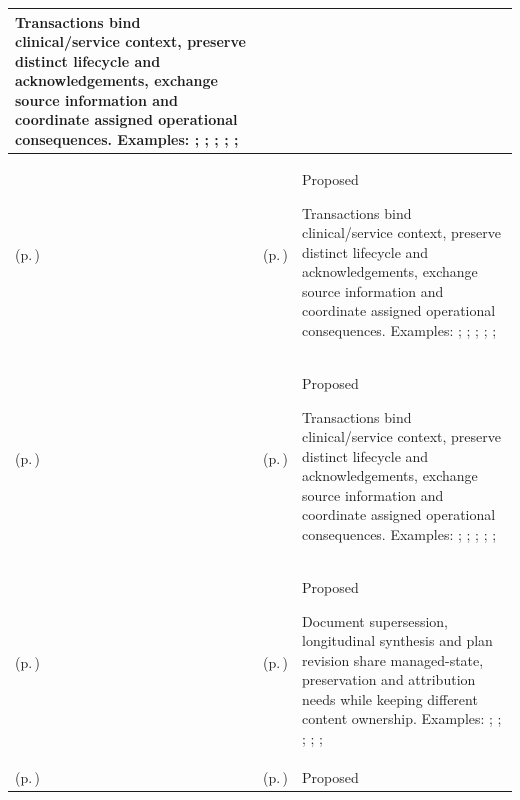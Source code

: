 \begin{longtable}{|>{\raggedright\arraybackslash}p{0.27\TableWidth}|>{\raggedright\arraybackslash}p{0.27\TableWidth}|>{\raggedright\arraybackslash}p{0.46\TableWidth}|}
Transactions bind clinical/service context, preserve distinct lifecycle and acknowledgements, exchange source information and coordinate assigned operational consequences. Examples: \nameref{feature:feat-sa-08}; \nameref{feature:feat-sa-09}; \nameref{feature:feat-sa-10}; \nameref{function:establish-encounter-context}; \nameref{service:encounter-context-resolution}; \nameref{function:progress-encounter-state}\\\hline
\nameref{cap:bec-episode-encounter-administration} (p.\,\pageref{cap:bec-episode-encounter-administration}) & \nameref{cap:ec-08} (p.\,\pageref{cap:ec-08}) & Proposed

Transactions bind clinical/service context, preserve distinct lifecycle and acknowledgements, exchange source information and coordinate assigned operational consequences. Examples: \nameref{feature:feat-sa-08}; \nameref{feature:feat-sa-09}; \nameref{feature:feat-sa-10}; \nameref{function:establish-encounter-context}; \nameref{service:encounter-context-resolution}; \nameref{function:progress-encounter-state}\\\hline
\nameref{cap:bec-episode-encounter-administration} (p.\,\pageref{cap:bec-episode-encounter-administration}) & \nameref{cap:ec-10} (p.\,\pageref{cap:ec-10}) & Proposed

Transactions bind clinical/service context, preserve distinct lifecycle and acknowledgements, exchange source information and coordinate assigned operational consequences. Examples: \nameref{feature:feat-sa-08}; \nameref{feature:feat-sa-09}; \nameref{feature:feat-sa-10}; \nameref{function:establish-encounter-context}; \nameref{service:encounter-context-resolution}; \nameref{function:progress-encounter-state}\\\hline
\nameref{cap:bec-clinical-record-administration} (p.\,\pageref{cap:bec-clinical-record-administration}) & \nameref{cap:ec-03} (p.\,\pageref{cap:ec-03}) & Proposed

Document supersession, longitudinal synthesis and plan revision share managed-state, preservation and attribution needs while keeping different content ownership. Examples: \nameref{feature:feat-sa-23}; \nameref{feature:feat-sa-24}; \nameref{feature:feat-sa-25}; \nameref{function:receive-clinical-document}; \nameref{service:clinical-document-ingress}; \nameref{function:govern-clinical-document-lifecycle}\\\hline
\nameref{cap:bec-clinical-record-administration} (p.\,\pageref{cap:bec-clinical-record-administration}) & \nameref{cap:ec-04} (p.\,\pageref{cap:ec-04}) & Proposed


\end{longtable}
